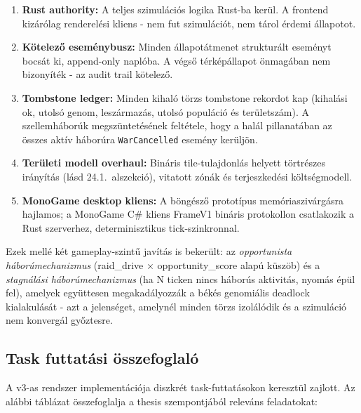 ﻿\documentclass[a4paper,12pt]{report}
\begin{document}
\begin{enumerate}
  \item \textbf{Rust authority:} A teljes szimulációs logika Rust-ba kerül. A frontend kizárólag renderelési kliens - nem fut szimulációt, nem tárol érdemi állapotot.
  \item \textbf{Kötelező eseménybusz:} Minden állapotátmenet strukturált eseményt bocsát ki, append-only naplóba. A végső térképállapot önmagában nem bizonyíték - az audit trail kötelező.
  \item \textbf{Tombstone ledger:} Minden kihaló törzs tombstone rekordot kap (kihalási ok, utolsó genom, leszármazás, utolsó populáció és területszám). A szellemháborúk megszüntetésének feltétele, hogy a halál pillanatában az összes aktív háborúra \texttt{WarCancelled} esemény kerüljön.
  \item \textbf{Területi modell overhaul:} Bináris tile-tulajdonlás helyett törtrészes irányítás (lásd 24.1.~alszekció), vitatott zónák és terjeszkedési költségmodell.
  \item \textbf{MonoGame desktop kliens:} A böngésző prototípus memóriaszivárgásra hajlamos; a MonoGame C\# kliens FrameV1 bináris protokollon csatlakozik a Rust szerverhez, determinisztikus tick-szinkronnal.
\end{enumerate}

Ezek mellé két gameplay-szintű javítás is bekerült: az \textit{opportunista háborúmechanizmus} (raid\_drive × opportunity\_score alapú küszöb) és a \textit{stagnálási háborúmechanizmus} (ha N ticken nincs háborús aktivitás, nyomás épül fel), amelyek együttesen megakadályozzák a békés genomiális deadlock kialakulását - azt a jelenséget, amelynél minden törzs izolálódik és a szimuláció nem konvergál győztesre.

\subsection*{Task futtatási összefoglaló}

A v3-as rendszer implementációja diszkrét task-futtatásokon keresztül zajlott. Az alábbi táblázat összefoglalja a thesis szempontjából releváns feladatokat:
\end{document}
